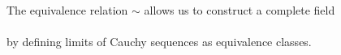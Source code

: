 \documentclass[preview]{standalone}
\begin{document}
\begin{center}
The equivalence relation $\sim$ allows us to construct a complete field\\\\by defining limits of Cauchy sequences as equivalence classes.
\end{center}
\end{document}
